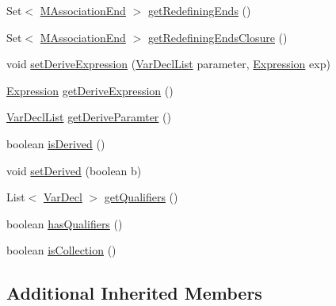 \begin{DoxyCompactItemize}
\item 
Set$<$ \hyperlink{classorg_1_1tzi_1_1use_1_1uml_1_1mm_1_1_m_association_end}{M\-Association\-End} $>$ \hyperlink{classorg_1_1tzi_1_1use_1_1uml_1_1mm_1_1_m_association_end_af7969eb0c88a52651d4ffdd8cedfb0c4}{get\-Redefining\-Ends} ()
\item 
Set$<$ \hyperlink{classorg_1_1tzi_1_1use_1_1uml_1_1mm_1_1_m_association_end}{M\-Association\-End} $>$ \hyperlink{classorg_1_1tzi_1_1use_1_1uml_1_1mm_1_1_m_association_end_a063f4c8c594eae933deadcadc5974b0d}{get\-Redefining\-Ends\-Closure} ()
\item 
void \hyperlink{classorg_1_1tzi_1_1use_1_1uml_1_1mm_1_1_m_association_end_a41dfc97179913a8f9bf5369c9c6a9dc6}{set\-Derive\-Expression} (\hyperlink{classorg_1_1tzi_1_1use_1_1uml_1_1ocl_1_1expr_1_1_var_decl_list}{Var\-Decl\-List} parameter, \hyperlink{classorg_1_1tzi_1_1use_1_1uml_1_1ocl_1_1expr_1_1_expression}{Expression} exp)
\item 
\hyperlink{classorg_1_1tzi_1_1use_1_1uml_1_1ocl_1_1expr_1_1_expression}{Expression} \hyperlink{classorg_1_1tzi_1_1use_1_1uml_1_1mm_1_1_m_association_end_a0114fd2231891619f41937f754cd9c0c}{get\-Derive\-Expression} ()
\item 
\hyperlink{classorg_1_1tzi_1_1use_1_1uml_1_1ocl_1_1expr_1_1_var_decl_list}{Var\-Decl\-List} \hyperlink{classorg_1_1tzi_1_1use_1_1uml_1_1mm_1_1_m_association_end_ac905d247094a184090aa9ae4200a576e}{get\-Derive\-Paramter} ()
\item 
boolean \hyperlink{classorg_1_1tzi_1_1use_1_1uml_1_1mm_1_1_m_association_end_a3423c5117c0b6331a87afc9c02460074}{is\-Derived} ()
\item 
void \hyperlink{classorg_1_1tzi_1_1use_1_1uml_1_1mm_1_1_m_association_end_a84cea73190c15eab663c1c78362b3386}{set\-Derived} (boolean b)
\item 
List$<$ \hyperlink{classorg_1_1tzi_1_1use_1_1uml_1_1ocl_1_1expr_1_1_var_decl}{Var\-Decl} $>$ \hyperlink{classorg_1_1tzi_1_1use_1_1uml_1_1mm_1_1_m_association_end_acdbc593011a25f713d2b1622f8166c5a}{get\-Qualifiers} ()
\item 
boolean \hyperlink{classorg_1_1tzi_1_1use_1_1uml_1_1mm_1_1_m_association_end_ada702702745c09a14bd24773fc5ce4e4}{has\-Qualifiers} ()
\item 
boolean \hyperlink{classorg_1_1tzi_1_1use_1_1uml_1_1mm_1_1_m_association_end_abe402540d42976da79aa4fa2de18304b}{is\-Collection} ()
\end{DoxyCompactItemize}
\subsection*{Additional Inherited Members}


